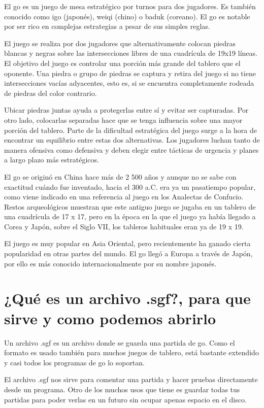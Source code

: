 \documentclass[12pt,a4paper]{report}
\begin{document}
El go es un juego de mesa estratégico por turnos para dos jugadores. Es 
también conocido como igo (japonés), weiqi (chino) o baduk (coreano). El go 
es notable por ser rico en complejas estrategias a pesar de sus simples reglas.

El juego se realiza por dos jugadores que alternativamente colocan piedras
blancas y negras sobre las intersecciones libres de una cuadrícula de 19x19
líneas. El objetivo del juego es controlar una porción más grande del tablero
que el oponente. Una piedra o grupo de piedras se captura y retira del juego si
no tiene intersecciones vacías adyacentes, esto es, si se encuentra
completamente rodeada de piedras del color contrario.

Ubicar piedras juntas ayuda a protegerlas entre sí y evitar ser capturadas. Por
otro lado, colocarlas separadas hace que se tenga influencia sobre una mayor
porción del tablero. Parte de la dificultad estratégica del juego surge a la
hora de encontrar un equilibrio entre estas dos alternativas. Los jugadores
luchan tanto de manera ofensiva como defensiva y deben elegir entre tácticas de
urgencia y planes a largo plazo más estratégicos.

El go se originó en China hace más de 2 500 años y aunque no se sabe con
exactitud cuándo fue inventado, hacia el 300 a.C. era ya un pasatiempo popular,
como viene indicado en una referencia al juego en los Analectas de Confucio.
Restos arqueológicos muestran que este antiguo juego se jugaba en un tablero de
una cuadrícula de 17 x 17, pero en la época en la que el juego ya había llegado
a Corea y Japón, sobre el Siglo VII, los tableros habituales eran ya de 19 x 19.

El juego es muy popular en Asia Oriental, pero recientemente ha ganado cierta
popularidad en otras partes del mundo. El go llegó a Europa a través de Japón,
por ello es más conocido internacionalmente por su nombre japonés.


\section{¿Qué es un archivo .sgf?, para que sirve y como podemos abrirlo}

\label{sgf} Un archivo .sgf es un archivo donde se guarda una partida de
go. Como el formato es usado también para muchos juegos de tablero, está
bastante extendido y casi todos los programas de go lo soportan.

El archivo .sgf nos sirve para comentar una partida y hacer pruebas directamente
desde un programa. Otro de los muchos
usos que tiene es guardar todas tus partidas para poder verlas en un futuro sin
ocupar apenas espacio en el disco. 
\end{document}
